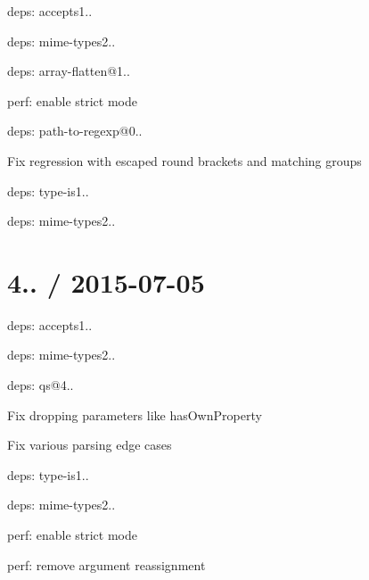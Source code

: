 \begin{DoxyItemize}
\item deps\+: accepts1..
\begin{DoxyItemize}
\item deps\+: mime-\/types2..
\end{DoxyItemize}
\item deps\+: array-\/flatten@1..
\begin{DoxyItemize}
\item perf\+: enable strict mode
\end{DoxyItemize}
\item deps\+: path-\/to-\/regexp@0..
\begin{DoxyItemize}
\item Fix regression with escaped round brackets and matching groups
\end{DoxyItemize}
\item deps\+: type-\/is1..
\begin{DoxyItemize}
\item deps\+: mime-\/types2..
\end{DoxyItemize}
\end{DoxyItemize}

\section*{4.. / 2015-\/07-\/05 }


\begin{DoxyItemize}
\item deps\+: accepts1..
\begin{DoxyItemize}
\item deps\+: mime-\/types2..
\end{DoxyItemize}
\item deps\+: qs@4..
\begin{DoxyItemize}
\item Fix dropping parameters like {\ttfamily has\+Own\+Property}
\item Fix various parsing edge cases
\end{DoxyItemize}
\item deps\+: type-\/is1..
\begin{DoxyItemize}
\item deps\+: mime-\/types2..
\item perf\+: enable strict mode
\item perf\+: remove argument reassignment
\end{DoxyItemize}
\end{DoxyItemize}

